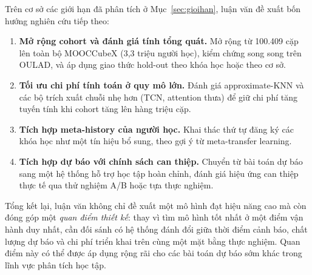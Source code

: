 Trên cơ sở các giới hạn đã phân tích ở Mục~\ref{sec:gioihan}, luận văn đề xuất bốn hướng nghiên cứu tiếp theo:

\begin{enumerate}[label=\arabic*.,leftmargin=1.2cm,topsep=3pt]
  \item \textbf{Mở rộng cohort và đánh giá tính tổng quát.} Mở rộng từ 100.409 cặp lên toàn bộ MOOCCubeX (3,3 triệu người học), kiểm chứng song song trên OULAD, và áp dụng giao thức hold-out theo khóa học hoặc theo cơ sở.
  \item \textbf{Tối ưu chi phí tính toán ở quy mô lớn.} Đánh giá approximate-KNN và các bộ trích xuất chuỗi nhẹ hơn (TCN, attention thưa) để giữ chi phí tăng tuyến tính khi cohort tăng lên hàng triệu cặp.
  \item \textbf{Tích hợp meta-history của người học.} Khai thác thứ tự đăng ký các khóa học như một tín hiệu bổ sung, theo gợi ý từ meta-transfer learning.
  \item \textbf{Tích hợp dự báo với chính sách can thiệp.} Chuyển từ bài toán dự báo sang một hệ thống hỗ trợ học tập hoàn chỉnh, đánh giá hiệu ứng can thiệp thực tế qua thử nghiệm A/B hoặc tựa thực nghiệm.
\end{enumerate}

Tổng kết lại, luận văn không chỉ đề xuất một mô hình đạt hiệu năng cao mà còn đóng góp một \emph{quan điểm thiết kế}: thay vì tìm mô hình tốt nhất ở một điểm vận hành duy nhất, cần đối sánh có hệ thống đánh đổi giữa thời điểm cảnh báo, chất lượng dự báo và chi phí triển khai trên cùng một mặt bằng thực nghiệm. Quan điểm này có thể được áp dụng rộng rãi cho các bài toán dự báo sớm khác trong lĩnh vực phân tích học tập.

\clearpage
